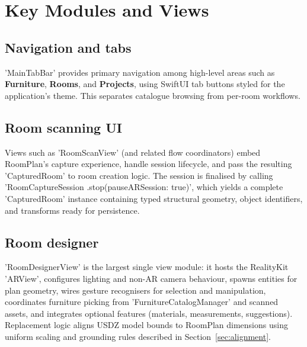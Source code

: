 
\section{Key Modules and Views}

\subsection{Navigation and tabs}

'MainTabBar' provides primary navigation among high-level areas such as \textbf{Furniture}, \textbf{Rooms}, and \textbf{Projects}, using SwiftUI tab buttons styled for the application's theme. This separates catalogue browsing from per-room workflows.

\subsection{Room scanning UI}

Views such as 'RoomScanView' (and related flow coordinators) embed RoomPlan's capture experience, handle session lifecycle, and pass the resulting 'CapturedRoom' to room creation logic. The session is finalised by calling 'RoomCaptureSession .stop(pauseARSession: true)', which yields a complete 'CapturedRoom' instance containing typed structural geometry, object identifiers, and transforms ready for persistence.

\subsection{Room designer}

'RoomDesignerView' is the largest single view module: it hosts the RealityKit 'ARView', configures lighting and non-AR camera behaviour, spawns entities for plan geometry, wires gesture recognisers for selection and manipulation, coordinates furniture picking from 'FurnitureCatalogManager' and scanned assets, and integrates optional features (materials, measurements, suggestions). Replacement logic aligns USDZ model bounds to RoomPlan dimensions using uniform scaling and grounding rules described in Section~\ref{sec:alignment}.

